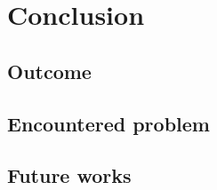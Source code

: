 \chapter{Conclusion}
\label{ch:conclusion}

\lipsum[1]

\section{Outcome}

\lipsum[1]

\section{Encountered problem}

\lipsum[2]

\section{Future works}

\lipsum[3]
